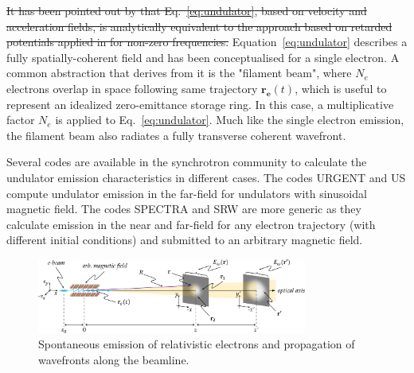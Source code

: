 \documentclass{iucr}              %
\newcommand{\remove}[1]{ {\color{blue} \sout{#1}}}
\begin{document}
\remove{It has been pointed out by  that Eq.~\ref{eq:undulator}, based on velocity and acceleration fields, is analytically equivalent to the approach based on retarded potentials applied in \cite{Chubar1995} for non-zero frequencies.}
Equation~\ref{eq:undulator} describes a fully spatially-coherent field and has been conceptualised for a single electron. A common abstraction that derives from it is the "filament beam", where $N_e$ electrons overlap in space following same trajectory $\textbf{r}_{\textbf{e}}(t)$, which is useful to  represent an idealized zero-emittance storage ring. In this case, a multiplicative factor $N_e$ is applied to Eq.~\ref{eq:undulator}. Much like the single electron emission, the filament beam also radiates a fully transverse coherent wavefront.



Several codes are available in the synchrotron community to calculate the undulator emission characteristics in different cases. The codes URGENT \cite{codeURGENT} and US \cite{codeUS} compute undulator emission in the far-field for undulators with sinusoidal magnetic field. The codes SPECTRA \cite{Tanaka2001} and SRW \cite{codeSRW} are more generic as they calculate emission in the near and far-field for any electron trajectory (with different initial conditions) and submitted to an arbitrary magnetic field.

\onecolumn
\begin{figure}\label{fig:coordinates}
    \centering
    \includegraphics[width=0.79\textwidth]{coordinates.pdf}
    \caption{Spontaneous emission of relativistic electrons and propagation of wavefronts along the beamline.}
\end{figure}
\twocolumn
\end{document}
